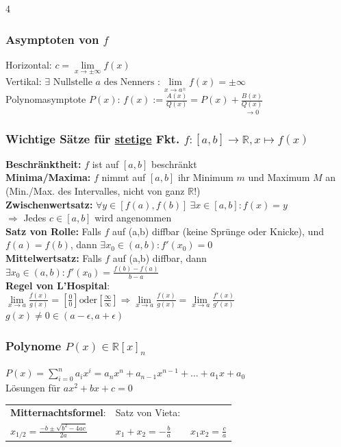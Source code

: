 \documentclass[6pt,a4paper]{scrartcl}
\newcommand{\ra}[0]{\ensuremath{\rightarrow}}
\begin{document}
\begin{multicols*}{4}
    \subsubsection{Asymptoten von $f$}
    Horizontal: $c=\lim\limits_{x\ra \pm \infty} f(x)$\\
    Vertikal: $\exists \text{ Nullstelle } a \text{ des Nenners }: \lim\limits_{x \rightarrow a^{\pm}} f(x) = \pm \infty$\\
    Polynomasymptote $P(x)$: $f(x):=\frac{A(x)}{Q(x)}=P(x)+ \underset{\ra 0}{\frac{B(x)}{Q(x)}}$ \\
    \begin{sectionbox}
        \subsubsection{Wichtige Sätze für \underline{stetige} Fkt. $f: [a,b] \rightarrow \mathbb R, x \mapsto f(x)$ }
        \textbf{Beschränktheit:} $f$ ist auf $[a,b]$ beschränkt\\
        \textbf{Minima/Maxima:} $f$ nimmt auf $[a,b]$ ihr Minimum $m$ und Maximum $M$ an (Min./Max. des Intervalles, nicht von ganz $\mathbb R$!)\\
        \textbf{Zwischenwertsatz:} $\forall y \in [f(a),f(b)]\ \exists x\in [a,b]:f(x)=y$\\
        $\Longrightarrow$ Jedes $c \in [a,b]$ wird angenommen\\
        \textbf{Satz von Rolle:} Falls $f$ auf (a,b) diffbar (keine Sprünge oder Knicke), und $f(a)=f(b)$, dann $\exists x_0 \in (a,b): f' (x_0) = 0$\\
        \textbf{Mittelwertsatz:} Falls $f$ auf (a,b) diffbar, dann $\exists x_0 \in (a,b):f'(x_0)=\frac{f(b)-f(a)}{b-a}$\\
        \textbf{Regel von L'Hospital}:\\ $\lim\limits_{x \rightarrow a} \frac{f(x)}{g(x)} = \left[ \frac{0}{0} \right] \text{oder} \left[ \frac{\infty}{\infty} \right] \Rightarrow \lim\limits_{x \rightarrow a} \frac{f(x)}{g(x)} = \lim\limits_{x \rightarrow a} \frac{f'(x)}{g'(x)}$\\
        $g(x) \ne 0 \in (a - \epsilon, a + \epsilon)$
    \end{sectionbox}

    \subsubsection{Polynome $P(x)\in\mathbb R[x]_n$}
    $P(x)=\sum_{i=0}^n a_ix^i=a_n x^n+a_{n-1} x^{n-1}+\dotsc+a_1x+a_0$ \\
    Lösungen für $ax^2+bx+c=0$ \\
    \begin{tabular}{l|l}
        \textbf{Mitternachtsformel}:                    & Satz von Vieta:                                                  \\
        $x_{1/2}=\frac{-b\pm\sqrt{b^2-4ac}}{2a}$  \quad & \quad   $x_1 + x_2 = - \frac{b}{a} \qquad x_1 x_2 = \frac{c}{a}$
    \end{tabular}


\end{multicols*}
\end{document}
